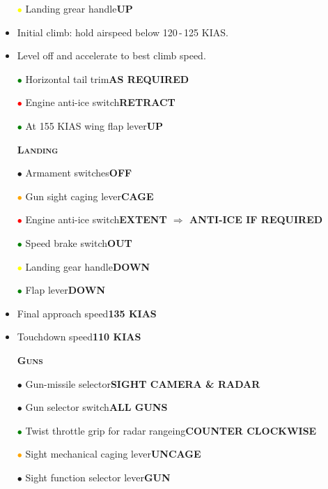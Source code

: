 \documentclass[a4paper,12pt,dvipsnames]{letter}
\newcommand{\button}[1]{\textbf{#1}}
\newcommand{\myHead}[1]{{\LARGE\textsc{\textbf{#1}}}}
\newcommand{\bi}{\textcolor{ProcessBlue}{$\bullet$\;}}
\newcommand{\ri}{\textcolor{Red}{$\bullet$\;}}
\newcommand{\gi}{\textcolor{Green}{$\bullet$\;}}
\newcommand{\yi}{\textcolor{Yellow}{$\bullet$\;}}
\newcommand{\oi}{\textcolor{Orange}{$\bullet$\;}}
\begin{document}
{\begin{itemize}
 \item[\yi] Landing grear handle\dotfill\button{UP}
 \item Initial climb: hold airspeed below 120\,-\,125 KIAS.
 \item Level off and accelerate to best climb speed.
 \item[\gi] Horizontal tail trim\dotfill\button{AS REQUIRED}
 \item[\ri] Engine anti-ice switch\dotfill\button{RETRACT}
 \item[\gi] At 155 KIAS wing flap lever\dotfill\button{UP}
\end{itemize}
\newpage
\begin{itemize}
 \item[] \myHead{Landing}
 \item[\bi] Armament switches\dotfill\button{OFF}
 \item[\oi] Gun sight caging lever\dotfill\button{CAGE}
 \item[\ri] Engine anti-ice switch\dotfill\button{EXTENT $\Rightarrow$ ANTI-ICE IF REQUIRED}
 \item[\gi] Speed brake switch\dotfill\button{OUT}
 \item[\yi] Landing gear handle\dotfill\button{DOWN}
 \item[\gi] Flap lever\dotfill\button{DOWN}
 \item Final approach speed\dotfill\button{135 KIAS}
 \item Touchdown speed\dotfill\button{110 KIAS}
\end{itemize}
\newpage
\begin{itemize}
 \item[] \myHead{Guns}
 \item[\bi] Gun-missile selector\dotfill\button{SIGHT CAMERA \& RADAR}
 \item[\bi] Gun selector switch\dotfill\button{ALL GUNS}
 \item[\gi] Twist throttle grip for radar rangeing\dotfill\button{COUNTER CLOCKWISE}
 \item[\oi] Sight mechanical caging lever\dotfill\button{UNCAGE}
 \item[\bi] Sight function selector lever\dotfill\button{GUN}

\end{itemize}}
\end{document}

